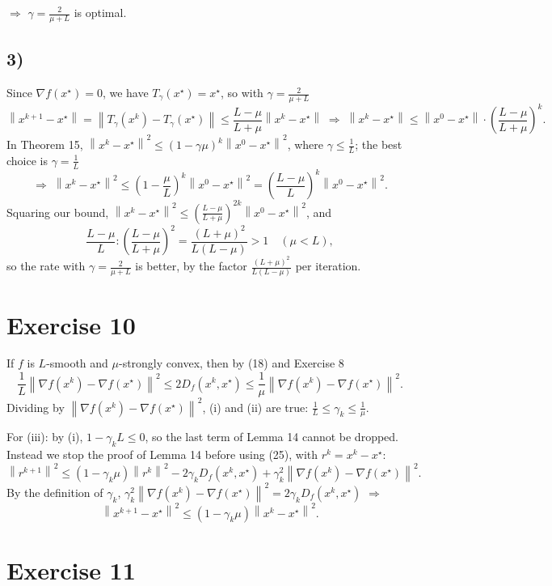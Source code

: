 \documentclass[11pt,a4paper]{article}
\newcommand{\norm}[1]{\left\| #1 \right\|}
\newcommand{\xs}{x^\star}
\begin{document}
$\Rightarrow$ $\gamma = \frac{2}{\mu+L}$ is optimal.

\subsection*{3)}
Since $\nabla f(\xs) = 0$, we have $T_\gamma(\xs) = \xs$, so with $\gamma = \frac{2}{\mu+L}$
\[
  \norm{x^{k+1} - \xs} = \norm{T_\gamma(x^k) - T_\gamma(\xs)}
  \le \frac{L-\mu}{L+\mu}\norm{x^k - \xs}
  \;\Rightarrow\;
  \norm{x^k - \xs} \le \norm{x^0 - \xs}\cdot\left(\frac{L-\mu}{L+\mu}\right)^k .
\]
In Theorem 15, $\norm{x^k - \xs}^2 \le (1-\gamma\mu)^k\norm{x^0 - \xs}^2$, where
$\gamma \le \frac{1}{L}$; the best choice is $\gamma = \frac{1}{L}$
\[
  \Rightarrow\; \norm{x^k - \xs}^2 \le \left(1 - \frac{\mu}{L}\right)^k\norm{x^0 - \xs}^2
  = \left(\frac{L-\mu}{L}\right)^k\norm{x^0 - \xs}^2 .
\]
Squaring our bound, $\norm{x^k - \xs}^2 \le \left(\frac{L-\mu}{L+\mu}\right)^{2k}\norm{x^0 - \xs}^2$, and
\[
  \frac{L-\mu}{L} : \left(\frac{L-\mu}{L+\mu}\right)^2
  = \frac{(L+\mu)^2}{L(L-\mu)} > 1
  \quad (\mu < L),
\]
so the rate with $\gamma = \frac{2}{\mu+L}$ is better, by the factor
$\frac{(L+\mu)^2}{L(L-\mu)}$ per iteration.

\section*{Exercise 10}

If $f$ is $L$-smooth and $\mu$-strongly convex, then by (18) and Exercise 8
\[
  \frac{1}{L}\norm{\nabla f(x^k) - \nabla f(\xs)}^2
  \le 2D_f(x^k, \xs)
  \le \frac{1}{\mu}\norm{\nabla f(x^k) - \nabla f(\xs)}^2 .
\]
Dividing by $\norm{\nabla f(x^k) - \nabla f(\xs)}^2$, (i) and (ii) are true:
$\frac{1}{L} \le \gamma_k \le \frac{1}{\mu}$.

For (iii): by (i), $1 - \gamma_k L \le 0$, so the last term of Lemma 14 cannot be
dropped. Instead we stop the proof of Lemma 14 before using (25), with
$r^k = x^k - \xs$:
\[
  \norm{r^{k+1}}^2 \le (1 - \gamma_k\mu)\norm{r^k}^2 - 2\gamma_k D_f(x^k, \xs)
  + \gamma_k^2\norm{\nabla f(x^k) - \nabla f(\xs)}^2 .
\]
By the definition of $\gamma_k$,
$\gamma_k^2\norm{\nabla f(x^k) - \nabla f(\xs)}^2 = 2\gamma_k D_f(x^k, \xs)$
$\Rightarrow$
\[
  \norm{x^{k+1} - \xs}^2 \le (1 - \gamma_k\mu)\norm{x^k - \xs}^2 .
\]

\section*{Exercise 11}
\end{document}

